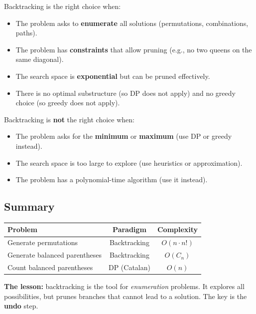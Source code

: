 \documentclass[11pt,a4paper]{article}
\begin{document}
Backtracking is the right choice when:
\begin{itemize}
    \item The problem asks to \textbf{enumerate} all solutions (permutations, combinations, paths).
    \item The problem has \textbf{constraints} that allow pruning (e.g., no two queens on the same diagonal).
    \item The search space is \textbf{exponential} but can be pruned effectively.
    \item There is no optimal substructure (so DP does not apply) and no greedy choice (so greedy does not apply).
\end{itemize}

Backtracking is \textbf{not} the right choice when:
\begin{itemize}
    \item The problem asks for the \textbf{minimum} or \textbf{maximum} (use DP or greedy instead).
    \item The search space is too large to explore (use heuristics or approximation).
    \item The problem has a polynomial-time algorithm (use it instead).
\end{itemize}

\subsection{Summary}

\begin{center}
\begin{tabular}{lcc}
\toprule
Problem & Paradigm & Complexity \\
\midrule
Generate permutations & Backtracking & $O(n \cdot n!)$ \\
Generate balanced parentheses & Backtracking & $O(C_n)$ \\
Count balanced parentheses & DP (Catalan) & $O(n)$ \\
\bottomrule
\end{tabular}
\end{center}

\textbf{The lesson:} backtracking is the tool for \emph{enumeration} problems. It explores all possibilities, but prunes branches that cannot lead to a solution. The key is the \textbf{undo} step.

\end{document}
